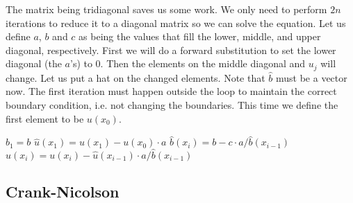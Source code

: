 The matrix being tridiagonal saves us some work. We only need to perform $2n$ 
iterations to reduce it to a diagonal matrix so we can solve the equation. Let 
us define $a$, $b$ and $c$ as being the values that fill the lower, middle, and 
upper diagonal, respectively. First we will do a forward substitution to set 
the lower diagonal (the $a$'s) to $0$. Then the elements on the middle diagonal 
and $u_j$ will change. Let us put a hat on the changed elements. Note that 
$\hat{b}$ must be a vector now. The first iteration must happen outside the loop
to maintain the correct boundary condition, i.e. not changing the boundaries. 
This time we define the first element to be $u(x_0)$.
% 
% 
\begin{algorithmic}
    \State $ \hat{b}_1 = b $
    \State $ \hat{u}(x_1) = u(x_1) - u(x_0) \cdot a $
        \State $ \hat{b}(x_i)
                 = b    - c \cdot a / \hat{b}(x_{i-1}) $
        \State $ \hat{u}(x_i)
                 = u(x_i) - \hat{u}(x_{i-1}) \cdot a / \hat{b}(x_{i-1}) $
    \EndFor
\end{algorithmic}
% 



\subsection{Crank-Nicolson}
